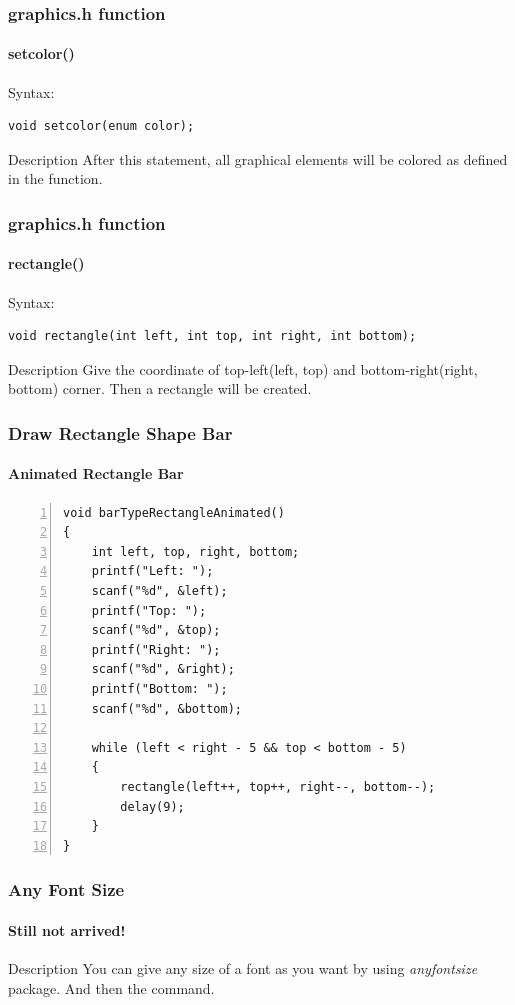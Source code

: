 \begin{frame}[fragile]
\frametitle{graphics.h function}
\framesubtitle{setcolor()}
\pause
\alert{Syntax:}
\begin{lstlisting}
void setcolor(enum color);
\end{lstlisting}
\pause
\begin{block}{Description}
After this statement, all graphical elements will be colored as defined in the function.
\end{block}
\end{frame}

\begin{frame}[fragile]
\frametitle{graphics.h function}
\framesubtitle{rectangle()}
\pause
\alert{Syntax:}
\begin{lstlisting}
void rectangle(int left, int top, int right, int bottom);
\end{lstlisting}
\pause
\begin{block}{Description}
Give the coordinate of top-left(left, top) and bottom-right(right, bottom) corner. Then a rectangle will be created.
\end{block}
\end{frame}

\begin{frame}[fragile]
\frametitle{Draw Rectangle Shape Bar}
\framesubtitle{Animated Rectangle Bar}
\pause
\begin{lstlisting}[caption=Filling a rectangle with rectangle, basicstyle=\footnotesize, numbers=left]
void barTypeRectangleAnimated()
{
    int left, top, right, bottom;
    printf("Left: ");
    scanf("%d", &left);
    printf("Top: ");
    scanf("%d", &top);
    printf("Right: ");
    scanf("%d", &right);
    printf("Bottom: ");
    scanf("%d", &bottom);

    while (left < right - 5 && top < bottom - 5)
    {
        rectangle(left++, top++, right--, bottom--);
        delay(9);
    }
}
\end{lstlisting}
\end{frame}

\begin{frame}[fragile]
\frametitle{Any Font Size}
\framesubtitle{Still not arrived!}
\begin{block}{Description}
You can give any size of a font as you want by using \textit{anyfontsize} package. And then the command.
\end{block}
\end{frame}



